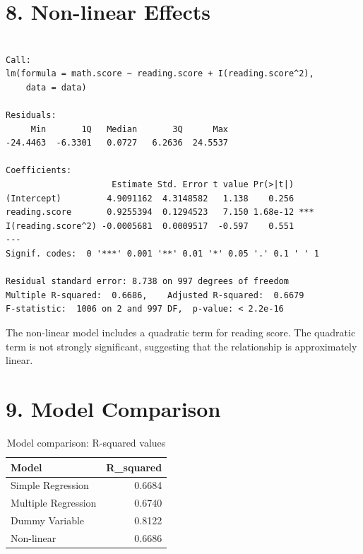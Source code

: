 \documentclass[
  letterpaper,
  DIV=11,
  numbers=noendperiod]{scrartcl}
\begin{document}
\section{8. Non-linear Effects}\label{non-linear-effects}

\begin{verbatim}

Call:
lm(formula = math.score ~ reading.score + I(reading.score^2), 
    data = data)

Residuals:
     Min       1Q   Median       3Q      Max 
-24.4463  -6.3301   0.0727   6.2636  24.5537 

Coefficients:
                     Estimate Std. Error t value Pr(>|t|)    
(Intercept)         4.9091162  4.3148582   1.138    0.256    
reading.score       0.9255394  0.1294523   7.150 1.68e-12 ***
I(reading.score^2) -0.0005681  0.0009517  -0.597    0.551    
---
Signif. codes:  0 '***' 0.001 '**' 0.01 '*' 0.05 '.' 0.1 ' ' 1

Residual standard error: 8.738 on 997 degrees of freedom
Multiple R-squared:  0.6686,    Adjusted R-squared:  0.6679 
F-statistic:  1006 on 2 and 997 DF,  p-value: < 2.2e-16
\end{verbatim}

The non-linear model includes a quadratic term for reading score. The
quadratic term is not strongly significant, suggesting that the
relationship is approximately linear.

\section{9. Model Comparison}\label{model-comparison}

{

\begin{longtable}[]{@{}lr@{}}

\caption{\label{tbl-models}Model comparison: R-squared values}

\tabularnewline

\toprule\noalign{}
Model & R\_squared \\
\midrule\noalign{}
\endhead
\bottomrule\noalign{}
\endlastfoot
Simple Regression & 0.6684 \\
Multiple Regression & 0.6740 \\
Dummy Variable & 0.8122 \\
Non-linear & 0.6686 \\

\end{longtable}

}
\end{document}
